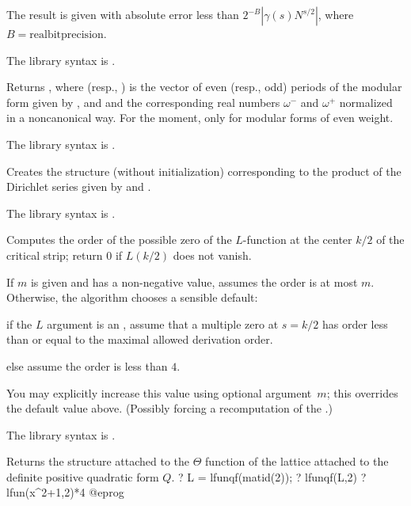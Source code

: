 The result is given with absolute error less than $2^{-B}|\gamma(s)N^{s/2}|$,
where $B = \text{realbitprecision}$.

The library syntax is .

\label{se:lfunmfspec}
Returns ,
 where  (resp., ) is the vector of even (resp., odd)
 periods of the modular form given by , and  and
  the corresponding real numbers $\omega^-$ and $\omega^+$
 normalized in a noncanonical way. For the moment, only for modular forms of even weight.

The library syntax is .

\label{se:lfunmul}
Creates the  structure (without initialization) corresponding
 to the product of the Dirichlet series given by  and
 .

The library syntax is .

\label{se:lfunorderzero}
Computes the order of the possible zero of the $L$-function at the
center $k/2$ of the critical strip; return $0$ if $L(k/2)$ does not vanish.

If $m$ is given and has a non-negative value, assumes the order is at most $m$.
Otherwise, the algorithm chooses a sensible default:

\item if the $L$ argument is an , assume that a multiple zero at
$s = k / 2$ has order less than or equal to the maximal allowed derivation
order.

\item else assume the order is less than $4$.

You may explicitly increase this value using optional argument~$m$; this
overrides the default value above. (Possibly forcing a recomputation
of the .)

The library syntax is .

\label{se:lfunqf}
Returns the  structure attached to the $\Theta$ function
of the lattice attached to the definite positive quadratic form $Q$.
\bprog
? L = lfunqf(matid(2));
? lfunqf(L,2)
? lfun(x^2+1,2)*4
@eprog

